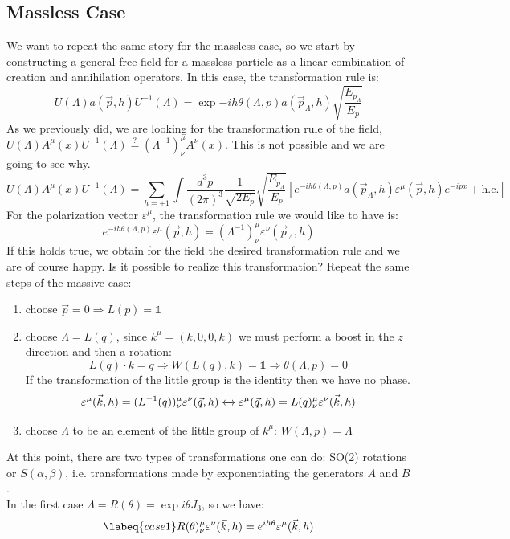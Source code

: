 \documentclass[../main.tex]{subfiles}
\begin{document}
\subsection{Massless Case}
We want to repeat the same story for the massless case, so we start by constructing a general free field for a massless particle as a linear combination of creation and annihilation operators. In this case, the transformation rule is:
\[
U(\Lambda)a(\vec{p},h)U^{-1}(\Lambda)=\exp{-ih\theta(\Lambda,p)}a(\vec{p}_\Lambda,h)\sqrt{\frac{E_{p_\Lambda}}{E_p}}
\]
As we previously did, we are looking for the transformation rule of the field, $U(\Lambda)A^\mu(x)U^{-1}(\Lambda)\stackrel{?}{=}(\Lambda^{-1})^\mu_\nu A^\nu(x)$. This is not possible and we are going to see why.
\[
U(\Lambda)A^\mu(x)U^{-1}(\Lambda)=\sum_{h=\pm1}\int\frac{d^3p}{(2\pi)^3}\frac{1}{\sqrt{2E_p}}\sqrt{\frac{E_{p_\Lambda}}{E_p}}\left[e^{-ih\theta(\Lambda,p)}a(\vec{p}_\Lambda,h)\varepsilon^\mu(\vec{p},h)e^{-ipx}+\text{h.c.}\right]
\]
For the polarization vector $\varepsilon^\mu$, the transformation rule we would like to have is:
\[
e^{-ih\theta(\Lambda,p)}\varepsilon^\mu(\vec{p},h)=(\Lambda^{-1})^\mu_\nu\varepsilon^\nu(\vec{p}_\Lambda,h)
\]
If this holds true, we obtain for the field the desired transformation rule and we are of course happy. Is it possible to realize this transformation? Repeat the same steps of the massive case:
\begin{enumerate}
    \item choose $\Vec{p}=0\Rightarrow L(p)=\mathbb{1}$
    \item choose $\Lambda=L(q)$, since $k^\mu=(k,0,0,k)$ we must perform a boost in the $z$ direction and then a rotation:
    \[
    L(q)\cdot k=q\Rightarrow W(L(q),k)=\mathbb{1}\Rightarrow\theta(\Lambda,p)=0
    \]
    If the transformation of the little group is the identity then we have no phase.
    \[
    \varepsilon^\mu(\vec{k},h)=(L^{-1}(q))^\mu_\nu\varepsilon^\nu(\vec{q},h)\xleftrightarrow[]{}\varepsilon^\mu(\vec{q},h)=L(q)^\mu_\nu\varepsilon^\nu(\vec{k},h)
    \]
    \item choose $\Lambda$ to be an element of the little group of $k^\mu$: $W(\Lambda,p)=\Lambda$
\end{enumerate}
At this point, there are two types of transformations one can do: SO(2) rotations or $S(\alpha,\beta)$, i.e. transformations made by exponentiating the generators $A$ and $B$.\\
In the first case $\Lambda=R(\theta)=\exp{i\theta J_3}$, so we have:
\begin{equation}
\labeq{case1}
R(\theta)^\mu_\nu\varepsilon^\nu(\vec{k},h)=e^{ih\theta}\varepsilon^\mu(\vec{k},h)
\end{equation}
\end{document}
